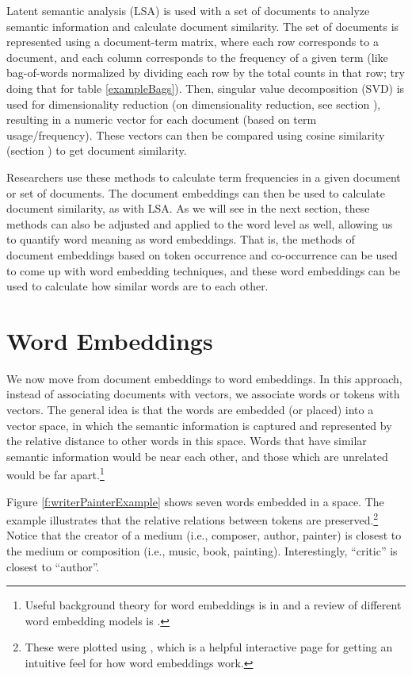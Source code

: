 Latent semantic analysis (LSA) is used with a set of documents to analyze semantic information and calculate document similarity. The set of documents is represented using a document-term matrix, where each row corresponds to a document, and each column corresponds to the frequency of a given term (like bag-of-words normalized by dividing each row by the total counts in that row; try doing that for table \ref{exampleBags}). Then, singular value decomposition (SVD) is used for dimensionality reduction (on dimensionality reduction, see section ), resulting in a numeric vector for each document (based on term usage/frequency). These vectors can then be compared using cosine similarity (section ) to get document similarity.

Researchers use these methods to calculate term frequencies in a given document or set of documents. The document embeddings can then be used to calculate document similarity, as with LSA. As we will see in the next section, these methods can also be adjusted and applied to the word level as well, allowing us to quantify word meaning as word embeddings. That is, the methods of document embeddings based on token occurrence and co-occurrence can be used to come up with word embedding techniques, and these word embeddings can be used to calculate how similar words are to each other.

\section{Word Embeddings}

We now move from document embeddings to word embeddings. In this approach, instead of associating documents with vectors, we associate words or tokens with vectors. The general idea is that the words are embedded (or placed) into a vector space, in which the semantic information is captured and represented by the relative distance to other words in this space. Words that have similar semantic information would be near each other, and those which are unrelated would be far apart.\footnote{Useful  background theory for word embeddings is in \cite{lenci2018distributional} and a review of different word embedding models is \cite{zaland2023comprehensive}.}

Figure \ref{f:writerPainterExample} shows seven words embedded in a space. The example illustrates that the relative relations between tokens are preserved.\footnote{These were plotted using , which is a helpful interactive page for getting an intuitive feel for how word embeddings work.}  Notice that the creator of a medium (i.e., composer, author, painter) is closest to the medium or composition (i.e., music, book, painting). Interestingly, ``critic'' is closest to ``author''.

